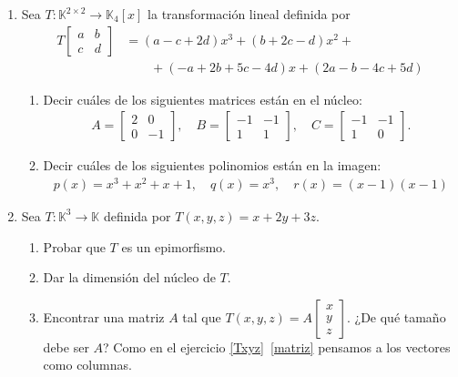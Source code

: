 \begin{enumerate}[topsep=6pt, itemsep=.4cm]
        \item Sea $T:\mathbb{K}^{2\times 2}\longrightarrow\mathbb{K}_{4}[x]$ la transformación lineal definida por
        \begin{align*}
        T   \begin{bmatrix}  a&b\\c&d \end{bmatrix} &= (a-c+2d)x^3+(b+2c-d)x^2+ \\
        &\qquad+(-a+2b+5c-4d)x+(2a-b-4c+5d)
        \end{align*}
        \begin{enumerate}
            \item\label{tl-matrices-pol-a} Decir cuáles de los siguientes matrices están en el núcleo:
                \begin{align*}
                    A=\begin{bmatrix}
                        2&0\\0&-1
                    \end{bmatrix},
                \quad
                B=\begin{bmatrix}
                    -1&-1\\1&1
                \end{bmatrix},
                \quad
                C=\begin{bmatrix}
                    -1&-1\\1&0
                \end{bmatrix}.
                \end{align*}
            \item\label{tl-matrices-pol-b} Decir cuáles de los siguientes polinomios están en la imagen:
                \begin{align*}
                    p(x)=x^3+x^2+x+1,\quad q(x)=x^3, \quad r(x)=(x-1)(x-1) 
                \end{align*}
        \end{enumerate}
    
    \rta
    
    \item\label{funcional ej}  Sea $T:\mathbb{K}^3\longrightarrow\mathbb{K}$ definida por $T(x,y,z)=x+2y+3z$.
    \begin{enumerate}
        \item\label{funcional ej a} Probar que $T$ es un epimorfismo.
        \item\label{funcional ej b} Dar la dimensión del núcleo de $T$.
        \item\label{funcional ej c} Encontrar una matriz $A$ tal que
            $T(x,y,z)=A\begin{bmatrix}
            x\\y\\z \end{bmatrix}$. ¿De qué tamaño debe ser $A$? Como en el ejercicio \ref{Txyz}\, \ref{matriz} pensamos a los vectores como columnas. 
    \end{enumerate}


\end{enumerate}
